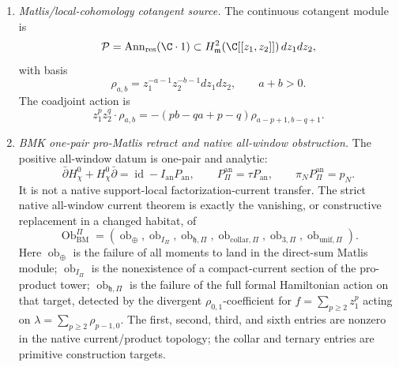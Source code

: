 \begin{enumerate}
  \item \emph{Matlis/local-cohomology cotangent source.}
  The continuous cotangent module is
  \[
    \mathcal P=
    \operatorname{Ann}_{\mathrm{res}}(\C\cdot1)
    \subset H^2_{\mathfrak m}(\C[[z_1,z_2]])\,dz_1dz_2,
  \]
  with basis
  \[
    \rho_{a,b}=z_1^{-a-1}z_2^{-b-1}dz_1dz_2,\qquad a+b>0.
  \]
  The coadjoint action is
  \[
    z_1^p z_2^q\cdot\rho_{a,b}
    =
    -(pb-qa+p-q)\rho_{a-p+1,b-q+1}.
  \]

  \item \emph{BMK one-pair pro-Matlis retract and native all-window
  obstruction.}
  The positive all-window datum is one-pair and analytic:
  \[
    \bar\partial H_\chi^0+H_\chi^0\bar\partial
    =
    \operatorname{id}-I_{\mathrm{an}}P_{\mathrm{an}},
    \qquad
    P_{\Pi}^{\mathrm{an}}=\tau P_{\mathrm{an}},
    \qquad
    \pi_NP_{\Pi}^{\mathrm{an}}=p_N .
  \]
  It is not a native support-local factorization-current transfer.  The
  strict native all-window current theorem is exactly the vanishing, or
  constructive replacement in a changed habitat, of
  \[
    \operatorname{Ob}^{\Pi}_{\mathrm{BM}}
    =
    (\operatorname{ob}_{\oplus},
     \operatorname{ob}_{I_\Pi},
     \operatorname{ob}_{\mathfrak h,\Pi},
     \operatorname{ob}_{\mathrm{collar},\Pi},
     \operatorname{ob}_{3,\Pi},
     \operatorname{ob}_{\mathrm{unif},\Pi}).
  \]
  Here \(\operatorname{ob}_{\oplus}\) is the failure of all moments to
  land in the direct-sum Matlis module; \(\operatorname{ob}_{I_\Pi}\)
  is the nonexistence of a compact-current section of the pro-product
  tower; \(\operatorname{ob}_{\mathfrak h,\Pi}\) is the failure of the
  full formal Hamiltonian action on that target, detected by the
  divergent \(\rho_{0,1}\)-coefficient for \(f=\sum_{p\ge2}z_1^p\)
  acting on \(\lambda=\sum_{p\ge2}\rho_{p-1,0}\).  The first, second,
  third, and sixth entries are nonzero in the native
  current/product topology; the collar and ternary entries are
  primitive construction targets.


\end{enumerate}
